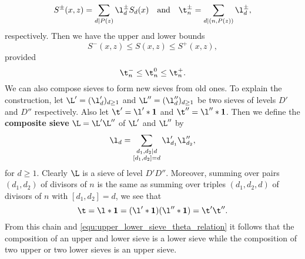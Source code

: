      \[
        S^{\pm}(x,z) = \sum_{d \mid P(z)}\l_{d}^{\pm}S_{d}(x) \quad \text{and} \quad \t_{n}^{\pm} = \sum_{d \mid (n,P(z))}\l_{d}^{\pm},
     \]
     respectively. Then we have the upper and lower bounds
    \[
      S^{-}(x,z) \le S(x,z) \le S^{+}(x,z),
    \]
    provided
    \begin{equation}\label{equ:upper_lower_sieve_theta_relation}
      \t_{n}^{-} \le \t_{n}^{0} \le \t_{n}^{+}.
    \end{equation}
    We can also compose sieves to form new sieves from old ones. To explain the construction, let $\L' = (\l'_{d})_{d \ge 1}$ and $\L'' = (\l''_{d})_{d \ge 1}$ be two sieves of levels $D'$ and $D''$ respectively. Also let $\t' = \l' \ast \mathbf{1}$ and $\t'' = \l'' \ast \mathbf{1}$. Then we define the \textbf{composite sieve} $\L = \L'\L''$ of $\L'$ and $\L''$ by
    \[
      \l_{d} = \sum_{\substack{ d_{1},d_{2} \mid d \\ [d_{1},d_{2}] = d}}\l'_{d_{1}}\l''_{d_{2}},
    \]
    for $d \ge 1$. Clearly $\L$ is a sieve of level $D'D''$. Moreover, summing over pairs $(d_{1},d_{2})$ of divisors of $n$ is the same as summing over triples $(d_{1},d_{2},d)$ of divisors of $n$ with $[d_{1},d_{2}] = d$, we see that
    \[
      \t = \l \ast \mathbf{1} = (\l' \ast \mathbf{1})(\l'' \ast \mathbf{1}) = \t'\t''.
    \]
    From this chain and \cref{equ:upper_lower_sieve_theta_relation} it follows that the composition of an upper and lower sieve is a lower sieve while the composition of two upper or two lower sieves is an upper sieve.

